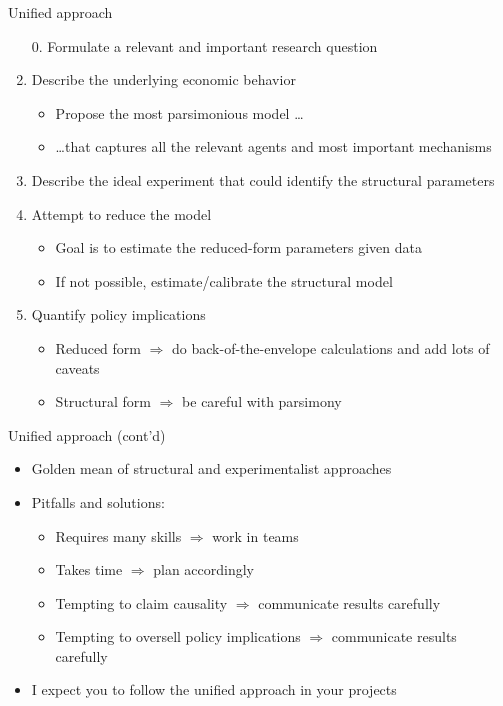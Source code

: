 \documentclass[aspectratio=169,compress,t,xcolor=table]{beamer}
\begin{document}
\begin{frame}{Unified approach}
  \begin{enumerate}
    \vfill\item[0.] Formulate a relevant and important research question
    \vfill\item Describe the underlying economic behavior
    \begin{itemize}
      \item Propose the most parsimonious model \ldots
      \item \ldots that captures all the relevant agents and most important mechanisms
    \end{itemize}
    \vfill\item Describe the ideal experiment that could identify the structural parameters
    \vfill\item Attempt to reduce the model
    \begin{itemize}
      \item Goal is to estimate the reduced-form parameters given data
      \item If not possible, estimate/calibrate the structural model
    \end{itemize}
    \vfill\item Quantify policy implications
    \begin{itemize}
      \item Reduced form \enskip \(\Rightarrow\) do back-of-the-envelope calculations and add lots of caveats
      \item Structural form \(\Rightarrow\) be careful with parsimony
    \end{itemize}
  \end{enumerate}
\end{frame}

\begin{frame}[c]{Unified approach (cont'd)}
  \begin{itemize}
    \vfill\item Golden mean of structural and experimentalist approaches
    \vfill\item Pitfalls and solutions:
    \begin{itemize}
      \item Requires many skills \hspace*{9.5em} \(\Rightarrow\) work in teams
      \item Takes time \hspace*{13.2em}\quad\(\Rightarrow\) plan accordingly
      \item Tempting to claim causality \hspace*{6.7em}\(\Rightarrow\) communicate results carefully
      \item Tempting to oversell policy implications \quad\(\Rightarrow\) communicate results carefully
    \end{itemize}
    \vfill\item I expect you to follow the unified approach in your projects
  \end{itemize}
\end{frame}
\end{document}
